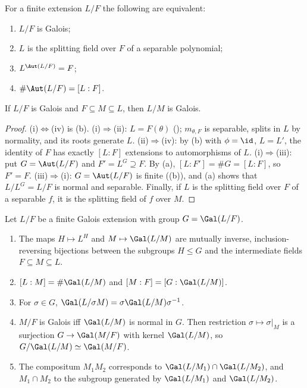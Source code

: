 \begin{theorem}\label{thm:galois:galois-equivalences}
For a finite extension $L/F$ the following are equivalent:
\begin{enumerate}[label=(\roman*)]
\item $L/F$ is Galois;
\item $L$ is the splitting field over $F$ of a separable polynomial;
\item $L^{\Aut(L/F)}=F$;
\item $\#\Aut(L/F)=[L:F]$.
\end{enumerate}
If $L/F$ is Galois and $F\subseteq M\subseteq L$, then $L/M$ is Galois.
\end{theorem}

\begin{proof}
(i)$\Leftrightarrow$(iv) is (b). (i)$\Rightarrow$(ii): $L=F(\theta)$ (); $m_{\theta,F}$ is separable,
splits in $L$ by normality, and its roots generate $L$. (ii)$\Rightarrow$(iv): by (b) with $\phi=\id$, $L=L'$, the identity of
$F$ has exactly $[L:F]$ extensions to automorphisms of $L$. (i)$\Rightarrow$(iii): put $G=\Aut(L/F)$ and $F'=L^G\supseteq F$. By (a),
$[L:F']=\#G=[L:F]$, so $F'=F$. (iii)$\Rightarrow$(i): $G=\Aut(L/F)$ is finite ((b)), and (a) shows that $L/L^G=L/F$ is
normal and separable. Finally, if $L$ is the splitting field over $F$ of a separable $f$, it is the splitting field of $f$ over $M$.
\end{proof}

\begin{theorem}\label{thm:galois:fundamental}
Let $L/F$ be a finite Galois extension with group $G=\Gal(L/F)$.
\begin{enumerate}[label=(\alph*)]
\item The maps $H\mapsto L^H$ and $M\mapsto\Gal(L/M)$ are mutually inverse, inclusion-reversing bijections between the subgroups $H\le G$ and the
intermediate fields $F\subseteq M\subseteq L$.
\item $[L:M]=\#\Gal(L/M)$ and $[M:F]=[G:\Gal(L/M)]$.
\item For $\sigma\in G$, $\Gal(L/\sigma M)=\sigma\Gal(L/M)\sigma^{-1}$.
\item $M/F$ is Galois iff $\Gal(L/M)$ is normal in $G$. Then restriction $\sigma\mapsto\sigma|_M$ is a surjection $G\to\Gal(M/F)$ with kernel $\Gal(L/M)$,
so $G/\Gal(L/M)\simeq\Gal(M/F)$.
\item The compositum $M_1M_2$ corresponds to $\Gal(L/M_1)\cap\Gal(L/M_2)$, and $M_1\cap M_2$ to the subgroup generated by $\Gal(L/M_1)$ and $\Gal(L/M_2)$.
\end{enumerate}
\end{theorem}

